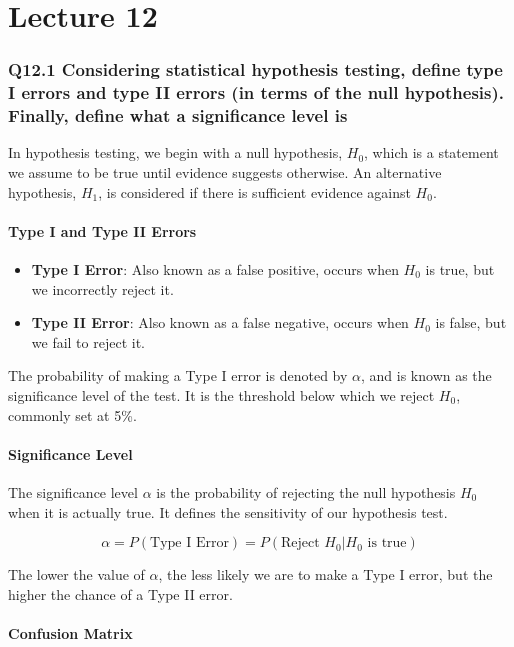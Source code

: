 \documentclass[11pt]{article}
\begin{document}
\part{Lecture 12}

\section{Q12.1 Considering statistical hypothesis testing, define type I errors and type II errors (in terms of the null hypothesis). Finally, define what a significance level is}

In hypothesis testing, we begin with a null hypothesis, $H_0$, which is a statement we assume to be true until evidence suggests otherwise. An alternative hypothesis, $H_1$, is considered if there is sufficient evidence against $H_0$.

\subsection*{Type I and Type II Errors}

\begin{itemize}
    \item \textbf{Type I Error}: Also known as a false positive, occurs when $H_0$ is true, but we incorrectly reject it.
    \item \textbf{Type II Error}: Also known as a false negative, occurs when $H_0$ is false, but we fail to reject it.
\end{itemize}

The probability of making a Type I error is denoted by $\alpha$, and is known as the significance level of the test. It is the threshold below which we reject $H_0$, commonly set at 5\%.

\subsection*{Significance Level}

The significance level $\alpha$ is the probability of rejecting the null hypothesis $H_0$ when it is actually true. It defines the sensitivity of our hypothesis test.

\[
    \alpha = P(\text{Type I Error}) = P(\text{Reject } H_0 | H_0 \text{ is true})
\]

The lower the value of $\alpha$, the less likely we are to make a Type I error, but the higher the chance of a Type II error.

\subsection*{Confusion Matrix}
\end{document}
